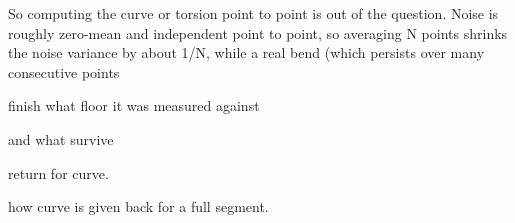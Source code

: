 So computing the curve or torsion point to point is out of the question.
Noise is roughly zero-mean and independent point to point, so averaging N points
  shrinks the noise variance by about 1/N, while a real bend (which persists over many consecutive points

finish what floor it was measured against

and what survive

return for curve.

how curve is given back for a full segment.